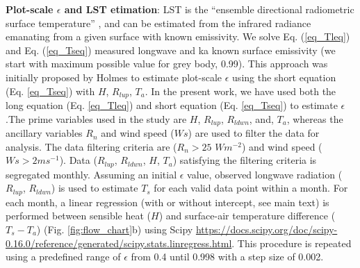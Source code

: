 \documentclass[fleqn,10pt]{wlscirep}
\begin{document}
\textbf{Plot-scale $\epsilon$ and LST etimation}:
LST is the “ensemble directional radiometric surface temperature” \cite{norman1995terminology}, and can be estimated from the infrared radiance emanating from a given surface with known emissivity\cite{kustas2007utility}. We solve Eq. (\ref{eq_Tleq}) and Eq. (\ref{eq_Tseq}) measured longwave and ka known surface emissivity (we start with maximum possible value for grey body, 0.99). This approach was initially proposed by Holmes\cite{holmes2009land} to estimate plot-scale $\epsilon$ using the short equation (Eq. \ref{eq_Tseq}) with $H$, $R_{lup}$, $T_{a}$. In the present work, we have used both the long equation (Eq. \ref{eq_Tleq}) and short equation (Eq. \ref{eq_Tseq}) to estimate $\epsilon$.The prime variables used in the study are $H$, $R_{lup}$, $R_{ldwn}$, and, $T_{a}$, whereas the ancillary variables $R_{n}$ and wind speed ($Ws$) are used to filter the data for analysis. The data filtering criteria are ($R_{n} > 25$ $Wm^{-2}$) and wind speed ($Ws > 2ms^{-1}$)\cite{holmes2009land}. Data ($R_{lup}$, $R_{ldwn}$, $H$, $T_{a}$) satisfying the filtering criteria is segregated monthly. 
Assuming an initial $\epsilon$ value, observed longwave radiation ($R_{lup}$, $R_{ldwn}$) is used to estimate $T_{s}$ for each valid data point within a month. For each month, a linear regression (with or without intercept, see main text) is performed between sensible heat ($H$) and surface-air temperature difference ($T_{s}-T_{a}$) (Fig. \ref{fig:flow_chart}b) using Scipy \url{https://docs.scipy.org/doc/scipy-0.16.0/reference/generated/scipy.stats.linregress.html}. 
This procedure is repeated using a predefined range of $\epsilon$ from 0.4 until 0.998 with a step size of 0.002.
\end{document}
